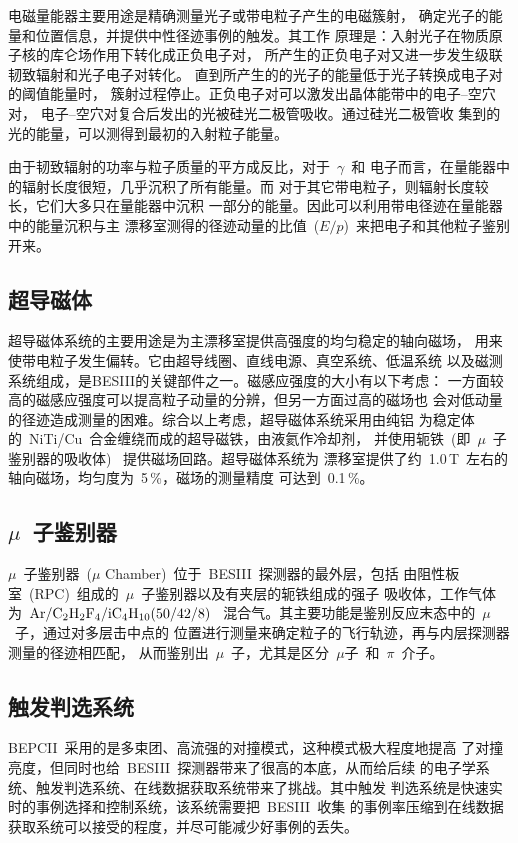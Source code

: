 电磁量能器主要用途是精确测量光子或带电粒子产生的电磁簇射，
确定光子的能量和位置信息，并提供中性径迹事例的触发。其工作
原理是：入射光子在物质原子核的库仑场作用下转化成正负电子对，
所产生的正负电子对又进一步发生级联韧致辐射和光子电子对转化。
直到所产生的的光子的能量低于光子转换成电子对的阈值能量时，
簇射过程停止。正负电子对可以激发出晶体能带中的电子--空穴对，
电子--空穴对复合后发出的光被硅光二极管吸收。通过硅光二极管收
集到的光的能量，可以测得到最初的入射粒子能量。

由于韧致辐射的功率与粒子质量的平方成反比，对于~$\gamma$~和
电子而言，在量能器中的辐射长度很短，几乎沉积了所有能量。而
对于其它带电粒子，则辐射长度较长，它们大多只在量能器中沉积
一部分的能量。因此可以利用带电径迹在量能器中的能量沉积与主
漂移室测得的径迹动量的比值~($E/p$)~来把电子和其他粒子鉴别开来。

\subsection{超导磁体}
超导磁体系统的主要用途是为主漂移室提供高强度的均匀稳定的轴向磁场，
用来使带电粒子发生偏转。它由超导线圈、直线电源、真空系统、低温系统
以及磁测系统组成，是BESIII的关键部件之一。磁感应强度的大小有以下考虑：
一方面较高的磁感应强度可以提高粒子动量的分辨，但另一方面过高的磁场也
会对低动量的径迹造成测量的困难。综合以上考虑，超导磁体系统采用由纯铝
为稳定体的~NiTi/Cu~合金缠绕而成的超导磁铁，由液氦作冷却剂，
并使用轭铁~(即~$\mu$~子鉴别器的吸收体)~ 提供磁场回路。超导磁体系统为
漂移室提供了约~1.0\,T~左右的轴向磁场，均匀度为~5\,\%，磁场的测量精度
可达到~0.1\,\%。

\subsection{$\mu$~子鉴别器}
$\mu$~子鉴别器~($\mu$ Chamber)~位于~BESIII~探测器的最外层，包括
由阻性板室~(RPC)~组成的~$\mu$~子鉴别器以及有夹层的轭铁组成的强子
吸收体，工作气体为~$\rm Ar/C_{2}H_{2}F_{4}/iC_{4}H_{10}(50/42/8)$
~混合气。其主要功能是鉴别反应末态中的~$\mu$~子，通过对多层击中点的
位置进行测量来确定粒子的飞行轨迹，再与内层探测器测量的径迹相匹配，
从而鉴别出~$\mu$~子，尤其是区分~$\mu$子~和~$\pi$~介子。

\subsection{触发判选系统}
BEPCII~采用的是多束团、高流强的对撞模式，这种模式极大程度地提高
了对撞亮度，但同时也给~BESIII~探测器带来了很高的本底，从而给后续
的电子学系统、触发判选系统、在线数据获取系统带来了挑战。其中触发
判选系统是快速实时的事例选择和控制系统，该系统需要把~BESIII~收集
的事例率压缩到在线数据获取系统可以接受的程度，并尽可能减少好事例的丢失。


